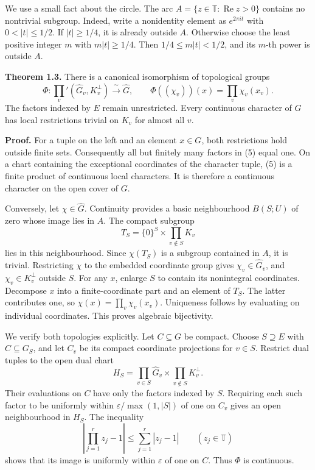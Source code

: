\documentclass[
  english,
  11pt,
  a4paper,
]{article}
\begin{document}
We use a small fact about the circle. The arc
\(A=\{z\in\mathbb T:\operatorname{Re}z>0\}\) contains no nontrivial
subgroup. Indeed, write a nonidentity element as \(e^{2\pi it}\) with
\(0<|t|\leq1/2\). If \(|t|\geq1/4\), it is already outside \(A\).
Otherwise choose the least positive integer \(m\) with \(m|t|\geq1/4\).
Then \(1/4\leq m|t|<1/2\), and its \(m\)-th power is outside \(A\).

\textbf{Theorem 1.3.} There is a canonical isomorphism of topological
groups \[\Phi:\prod_v'(\widehat G_v,K_v^\perp)
\xrightarrow{\ \sim\ }\widehat G,
\qquad
\Phi((\chi_v))(x)=\prod_v\chi_v(x_v).
\tag{5}\] The factors indexed by \(E\) remain unrestricted. Every
continuous character of \(G\) has local restrictions trivial on \(K_v\)
for almost all \(v\).

\textbf{Proof.} For a tuple on the left and an element \(x\in G\), both
restrictions hold outside finite sets. Consequently all but finitely
many factors in (5) equal one. On a chart containing the exceptional
coordinates of the character tuple, (5) is a finite product of
continuous local characters. It is therefore a continuous character on
the open cover of \(G\).

Conversely, let \(\chi\in\widehat G\). Continuity provides a basic
neighbourhood \(B(S;U)\) of zero whose image lies in \(A\). The compact
subgroup \[T_S=\{0\}^{S}\times\prod_{v\notin S}K_v\] lies in this
neighbourhood. Since \(\chi(T_S)\) is a subgroup contained in \(A\), it
is trivial. Restricting \(\chi\) to the embedded coordinate group gives
\(\chi_v\in\widehat G_v\), and \(\chi_v\in K_v^\perp\) outside \(S\).
For any \(x\), enlarge \(S\) to contain its nonintegral coordinates.
Decompose \(x\) into a finite-coordinate part and an element of \(T_S\).
The latter contributes one, so \(\chi(x)=\prod_v\chi_v(x_v)\).
Uniqueness follows by evaluating on individual coordinates. This proves
algebraic bijectivity.

We verify both topologies explicitly. Let \(C\subseteq G\) be compact.
Choose \(S\supseteq E\) with \(C\subseteq G_S\), and let \(C_v\) be its
compact coordinate projections for \(v\in S\). Restrict dual tuples to
the open dual chart
\[H_S=\prod_{v\in S}\widehat G_v\times\prod_{v\notin S}K_v^\perp.\]
Their evaluations on \(C\) have only the factors indexed by \(S\).
Requiring each such factor to be uniformly within
\(\varepsilon/\max(1,|S|)\) of one on \(C_v\) gives an open
neighbourhood in \(H_S\). The inequality
\[\left|\prod_{j=1}^rz_j-1\right|\leq\sum_{j=1}^r|z_j-1|\qquad(z_j\in\mathbb T)\]
shows that its image is uniformly within \(\varepsilon\) of one on
\(C\). Thus \(\Phi\) is continuous.
\end{document}
